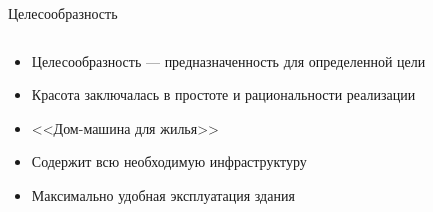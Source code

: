 \begin{frame}{Целесообразность}
    \begin{columns}[T,onlytextwidth]
        \begin{column}{0.56\textwidth}
            \begin{itemize}
                \item<1-> Целесообразность --- предназначенность для определенной цели
                \item<2-> Красота заключалась в простоте и рациональности реализации
                \item<3-> <<Дом-машина для жилья>>
                \item<4-> Содержит всю необходимую инфраструктуру
                \item<5-> Максимально удобная эксплуатация здания
            \end{itemize}
        \end{column}
        \begin{column}{0.5\textwidth}
        \end{column}
    \end{columns}
\end{frame}